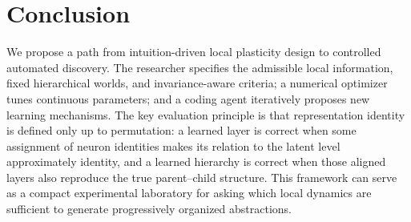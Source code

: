 \documentclass[11pt]{article}
\begin{document}
\section{Conclusion}
We propose a path from intuition-driven local plasticity design to controlled automated discovery. The researcher specifies the admissible local information, fixed hierarchical worlds, and invariance-aware criteria; a numerical optimizer tunes continuous parameters; and a coding agent iteratively proposes new learning mechanisms. The key evaluation principle is that representation identity is defined only up to permutation: a learned layer is correct when some assignment of neuron identities makes its relation to the latent level approximately identity, and a learned hierarchy is correct when those aligned layers also reproduce the true parent--child structure. This framework can serve as a compact experimental laboratory for asking which local dynamics are sufficient to generate progressively organized abstractions.
\end{document}
